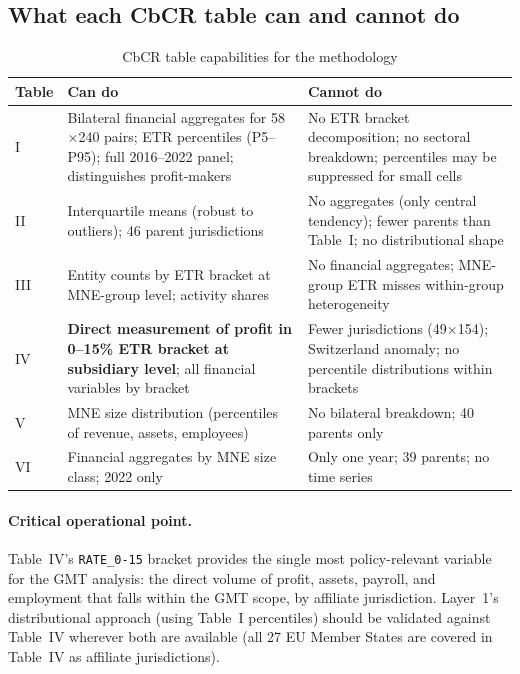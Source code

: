 \documentclass[11pt,a4paper]{article}
\newcommand{\code}[1]{\texttt{#1}}
\begin{document}
\subsection{What each CbCR table can and cannot do}\label{sec:table_capabilities}

\begin{table}[H]
\centering
\caption{CbCR table capabilities for the methodology}
\label{tab:capabilities}
\small
\begin{tabular}{@{}lp{5.5cm}p{5.5cm}@{}}
\toprule
Table & Can do & Cannot do \\
\midrule
I & Bilateral financial aggregates for 58$\times$240 pairs; ETR percentiles (P5--P95); full 2016--2022 panel; distinguishes profit-makers & No ETR bracket decomposition; no sectoral breakdown; percentiles may be suppressed for small cells \\
II & Interquartile means (robust to outliers); 46 parent jurisdictions & No aggregates (only central tendency); fewer parents than Table~I; no distributional shape \\
III & Entity counts by ETR bracket at MNE-group level; activity shares & No financial aggregates; MNE-group ETR misses within-group heterogeneity \\
IV & \textbf{Direct measurement of profit in 0--15\% ETR bracket at subsidiary level}; all financial variables by bracket & Fewer jurisdictions (49$\times$154); Switzerland anomaly; no percentile distributions within brackets \\
V & MNE size distribution (percentiles of revenue, assets, employees) & No bilateral breakdown; 40 parents only \\
VI & Financial aggregates by MNE size class; 2022 only & Only one year; 39 parents; no time series \\
\bottomrule
\end{tabular}
\end{table}

\paragraph{Critical operational point.} Table~IV's \code{RATE\_0-15} bracket provides the single most policy-relevant variable for the GMT analysis: the direct volume of profit, assets, payroll, and employment that falls within the GMT scope, by affiliate jurisdiction. Layer~1's distributional approach (using Table~I percentiles) should be validated against Table~IV wherever both are available (all 27 EU Member States are covered in Table~IV as affiliate jurisdictions).
\end{document}
